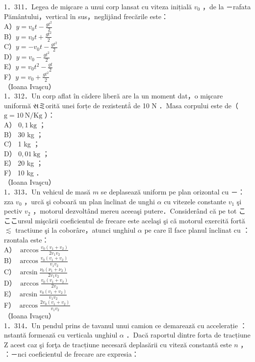 {1．311．Legea de mişcare a unui corp lansat cu viteza inițială $v_{0}$ ，de la －rafata Pământului，vertical în sus，neglijând frecările este：\\
A）$y=v_{0} t-\frac{g t^{2}}{2}$\\
B）$y=v_{0} t+\frac{g t^{2}}{2}$\\
C）$y=-v_{0} t-\frac{g t^{2}}{2}$\\
D）$y=v_{0}-\frac{g t^{2}}{2}$\\
E）$y=v_{0} t^{2}-\frac{g t}{2}$\\
F）$y=v_{0}+\frac{g t^{2}}{2}$\\
（Ioana Ivaşcu）\\
1．312．Un corp aflat în cădere liberă are la un moment dat，o mişcare uniformă સミorită unei forțe de rezistentẳ de 10 N ．Masa corpului este de（ $\mathrm{g}=10 \mathrm{~N} / \mathrm{Kg}$ ）：\\
A） $0,1 \mathrm{~kg}$ ；\\
B） 30 kg ；\\
C） 1 kg ；\\
D） $0,01 \mathrm{~kg}$ ；\\
E） 20 kg ；\\
F） 10 kg ．\\
（Ioana Ivaşcu）\\
1．313．Un vehicul de masă $m$ se deplasează uniform pe plan orizontal cu －：zza $v_{0}$ ，urcă şi coboară un plan înclinat de unghi $\alpha$ cu vitezele constante $v_{1}$ şi pectiv $v_{2}$ ，motorul dezvoltând mereu aceeaşi putere．Considerând că pe tot こここursul mişcării coeficientul de frecare este acelaşi şi că motorul exercită fortă $\lesssim$ tractiune şi la coborâre，atunci unghiul $\alpha$ pe care îl face planul înclinat cu ：rzontala este：\\
A） $\arccos \frac{v_{0}\left(v_{1}+v_{2}\right)}{2 v_{1} v_{2}}$\\
B） $\arccos \frac{v_{0}\left(v_{1}+v_{2}\right)}{v_{1} v_{2}}$\\
C） $\arcsin \frac{\nu_{0}\left(\nu_{1}+\nu_{2}\right)}{2 v_{1} v_{2}}$\\
D） $\arccos \frac{v_{0}\left(v_{1}+v_{2}\right)}{2 v_{2}}$\\
E） $\arcsin \frac{v_{0}\left(v_{1}+v_{2}\right)}{v_{1} v_{2}}$\\
F） $\arccos \frac{2 v_{0}\left(v_{1}+v_{2}\right)}{v_{1} v_{2}}$\\
（Ioana Ivaşcu）\\
1．314．Un pendul prins de tavanul unui camion ce demarează cu accelerație ：nstantă formează cu verticala unghiul $\alpha$ ．Dacă raportul dintre forta de tracțiune Z acest caz şi forţa de tracțiune necesară deplasării cu viteză constantă este $n$ ， ：－nci coeficientul de frecare are expresia：\\
}
